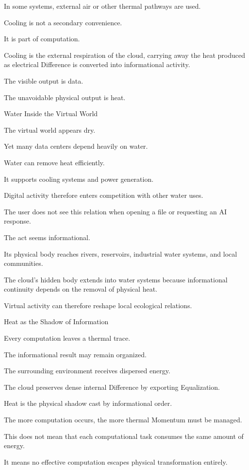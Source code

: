 In some systems, external air or other thermal pathways are used.

Cooling is not a secondary convenience.

It is part of computation.

Cooling is the external respiration of the cloud, carrying away the heat produced as electrical Difference is converted into informational activity.

The visible output is data.

The unavoidable physical output is heat.

Water Inside the Virtual World

The virtual world appears dry.

Yet many data centers depend heavily on water.

Water can remove heat efficiently.

It supports cooling systems and power generation.

Digital activity therefore enters competition with other water uses.

The user does not see this relation when opening a file or requesting an AI response.

The act seems informational.

Its physical body reaches rivers, reservoirs, industrial water systems, and local communities.

The cloud’s hidden body extends into water systems because informational continuity depends on the removal of physical heat.

Virtual activity can therefore reshape local ecological relations.

Heat as the Shadow of Information

Every computation leaves a thermal trace.

The informational result may remain organized.

The surrounding environment receives dispersed energy.

The cloud preserves dense internal Difference by exporting Equalization.

Heat is the physical shadow cast by informational order.

The more computation occurs, the more thermal Momentum must be managed.

This does not mean that each computational task consumes the same amount of energy.

It means no effective computation escapes physical transformation entirely.

